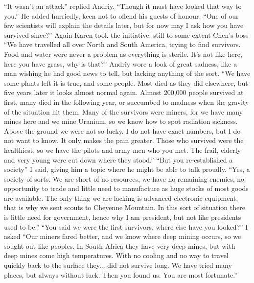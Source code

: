 \documentclass[a4paper]{article}
\begin{document}
“It wasn’t an attack” replied Andriy. “Though it must have looked that way to you.” He added hurriedly, keen not to offend his guests of honour. “One of our few scientists will explain the details later, but for now may I ask how you have survived since?”
Again Karen took the initiative; still to some extent Chen’s boss “We have travelled all over North and South America, trying to find survivors. Food and water were never a problem as everything is sterile. It’s not like here, here you have grass, why is that?”
Andriy wore a look of great sadness, like a man wishing he had good news to tell, but lacking anything of the sort. “We have some plants left it is true, and some people. Most died as they did elsewhere, but five years later it looks almost normal again. Almost 200,000 people survived at first, many died in the following year, or succumbed to madness when the gravity of the situation hit them. Many of the survivors were miners, for we have many mines here and we mine Uranium, so we know how to spot radiation sickness. Above the ground we were not so lucky. I do not have exact numbers, but I do not want to know. It only makes the pain greater. Those who survived were the healthiest, so we have the pilots and army men who you met. The frail, elderly and very young were cut down where they stood.”
“But you re-established a society” I said, giving him a topic where he might be able to talk proudly.
“Yes, a society of sorts. We are short of no resources, we have no remaining enemies, no opportunity to trade and little need to manufacture as huge stocks of most goods are available. The only thing we are lacking is advanced electronic equipment, that is why we sent scouts to Cheyenne Mountain. In this sort of situation there is little need for government, hence why I am president, but not like presidents used to be.”
“You said we were the first survivors, where else have you looked?” I asked
“Our miners fared better, and we know where deep mining occurs, so we sought out like peoples. In South Africa they have very deep mines, but with deep mines come high temperatures. With no cooling and no way to travel quickly back to the surface they... did not survive long. We have tried many places, but always without luck. Then you found us. You are most fortunate.”
\end{document}
